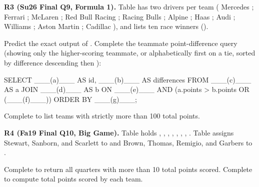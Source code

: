 \documentclass[10pt]{scrartcl}
\begin{document}
\begin{prob}
\textbf{R3 (Su26 Final Q9, Formula 1).} Table  has two drivers per team ( Mercedes ;  Ferrari ;  McLaren ;  Red Bull Racing ;  Racing Bulls ;  Alpine ;  Haas ;  Audi ;  Williams ;  Aston Martin ;  Cadillac ), and  lists ten race winners ().
\begin{enumerate}[(a)]
  \ii Predict the exact output of .
  \ii Complete the teammate point-difference query (showing only the higher-scoring teammate, or alphabetically first on a tie, sorted by difference descending then ):
\begin{sql}
SELECT   ___(a)___ AS id, ___(b)___ AS differences
FROM     ___(c)___ AS a JOIN ___(d)___ AS b
ON       ___(e)___ AND (a.points > b.points OR (___(f)___))
ORDER BY ___(g)___;
\end{sql}
  \ii Complete  to list teams with strictly more than 100 total points.
\end{enumerate}
\end{prob}

\begin{prob}
\textbf{R4 (Fa19 Final Q10, Big Game).} Table  holds , , , , , , , . Table  assigns Stewart, Sanborn, and Scarlett to  and Brown, Thomas, Remigio, and Garbers to .
\begin{enumerate}[(a)]
  \ii Complete  to return all quarters with more than 10 total points scored.
  \ii Complete  to compute total points scored by each team.
\end{enumerate}
\end{prob}
\end{document}
